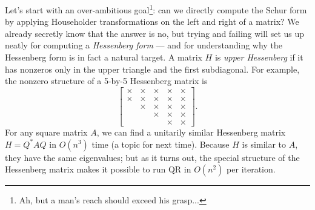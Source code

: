 \documentclass[12pt, leqno]{article} %
\begin{document}
Let's start with an over-ambitious goal\footnote{Ah, but a man's reach
  should exceed his grasp...}: can we directly compute the Schur form
by applying Householder transformations on the left and right of a
matrix?  We already secretly know that the answer is no, but trying
and failing will set us up neatly for computing a {\em Hessenberg form} ---
and for understanding why the Hessenberg form is in fact a natural
target.
A matrix $H$ is {\em upper Hessenberg} if it has nonzeros only in the
upper triangle and the first subdiagonal.  For example, the nonzero
structure of a 5-by-5 Hessenberg matrix is
\[
  \begin{bmatrix}
    \times & \times & \times & \times & \times \\
    \times & \times & \times & \times & \times \\
           & \times & \times & \times & \times \\
           &        & \times & \times & \times \\
           &        &        & \times & \times
  \end{bmatrix}.
\]
For any square matrix $A$, we can find a unitarily similar Hessenberg
matrix $H = Q^* A Q$ in $O(n^3)$ time (a topic for next time).
Because $H$ is similar to $A$, they have the same eigenvalues; but
as it turns out, the special structure of the Hessenberg matrix
makes it possible to run QR in $O(n^2)$ per iteration.
\end{document}
